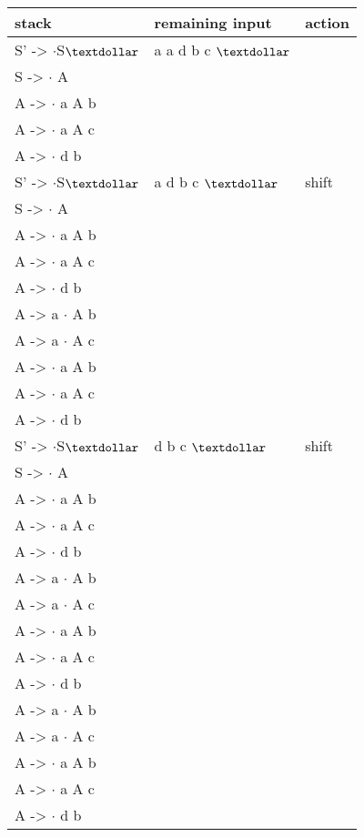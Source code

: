 \begin{latin}
\begin{tabular}{ | m{5cm} | m{5cm} | m{5cm} |  } \hline
stack & remaining input & action \\ \hline
S' -> {$\cdot$}S{$\textdollar$} & a a d b c {$\textdollar$} &  \\ 
S -> {$\cdot$} A & & \\ 
A -> {$\cdot$} a A b & & \\
A -> {$\cdot$} a A c & & \\
A -> {$\cdot$} d b & & \\ \hline

S' -> {$\cdot$}S{$\textdollar$} & a d b c {$\textdollar$} & shift  \\ 
S -> {$\cdot$} A & & \\ 
A -> {$\cdot$} a A b & & \\
A -> {$\cdot$} a A c & & \\
A -> {$\cdot$} d b & & \\
A -> a {$\cdot$} A b & &\\ 
A -> a {$\cdot$} A c & & \\ 
A -> {$\cdot$} a A b & & \\
A -> {$\cdot$} a A c & & \\
A -> {$\cdot$} d b & & \\ \hline

S' -> {$\cdot$}S{$\textdollar$} & d b c {$\textdollar$} & shift  \\ 
S -> {$\cdot$} A & & \\ 
A -> {$\cdot$} a A b & & \\
A -> {$\cdot$} a A c & & \\
A -> {$\cdot$} d b & & \\
A -> a {$\cdot$} A b & &\\ 
A -> a {$\cdot$} A c & & \\ 
A -> {$\cdot$} a A b & & \\
A -> {$\cdot$} a A c & & \\
A -> {$\cdot$} d b & & \\
A -> a {$\cdot$} A b & &  \\ 
A -> a {$\cdot$} A c & & \\ 
A -> {$\cdot$} a A b & & \\
A -> {$\cdot$} a A c & & \\
A -> {$\cdot$} d b & & \\ \hline
\end{tabular}
\end{latin}



